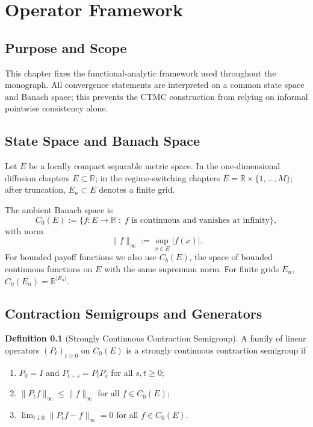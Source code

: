 \documentclass[11pt,a4paper,openany]{book}
\theoremstyle{definition}
\newtheorem{definition}{Definition}[chapter]
\theoremstyle{plain}
\theoremstyle{remark}
\newcommand{\1}{\mathbbm{1}}
\newcommand{\R}{\mathbb{R}}
\begin{document}
\newpage

\chapter*{Operator Framework}

\section{Purpose and Scope}

This chapter fixes the functional-analytic framework used throughout the monograph. All convergence statements are interpreted on a common state space and Banach space; this prevents the CTMC construction from relying on informal pointwise consistency alone.

\section{State Space and Banach Space}

Let $E$ be a locally compact separable metric space. In the one-dimensional diffusion chapters $E \subset \R$; in the regime-switching chapters $E = \R \times \{1,\ldots,M\}$; after truncation, $E_n \subset E$ denotes a finite grid.

The ambient Banach space is
\[
C_0(E) := \{f:E\to\R \;:\; f \text{ is continuous and vanishes at infinity}\},
\]
with norm
\[
\|f\|_\infty := \sup_{x\in E} |f(x)|.
\]
For bounded payoff functions we also use $C_b(E)$, the space of bounded continuous functions on $E$ with the same supremum norm. For finite grids $E_n$, $C_0(E_n)=\R^{|E_n|}$.

\section{Contraction Semigroups and Generators}

\begin{definition}[Strongly Continuous Contraction Semigroup]
A family of linear operators $(P_t)_{t\ge 0}$ on $C_0(E)$ is a strongly continuous contraction semigroup if
\begin{enumerate}[label=(\roman*)]
    \item $P_0=I$ and $P_{t+s}=P_tP_s$ for all $s,t\ge0$;
    \item $\|P_t f\|_\infty \le \|f\|_\infty$ for all $f\in C_0(E)$;
    \item $\lim_{t\downarrow0}\|P_tf-f\|_\infty=0$ for all $f\in C_0(E)$.
\end{enumerate}
\end{definition}
\end{document}
